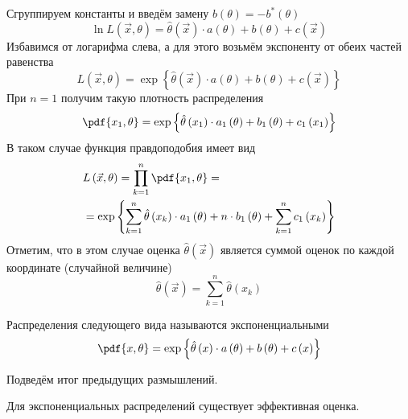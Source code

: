 Сгруппируем константы и введём замену
$b\left( \theta \right)=-b^*\left( \theta \right)$
\begin{equation*}
  \ln{L\left( \vec{x}, \theta \right)}
  = \hat{\theta}\left( \vec{x} \right)\cdot a\left( \theta \right)
    +b\left( \theta \right) + c\left( \vec{x} \right)
\end{equation*}
Избавимся от логарифма слева, а для этого возьмём экспоненту от обеих частей
равенства
\begin{equation*}
  L\left( \vec{x}, \theta \right)
  = \exp{\left\{\hat{\theta}\left( \vec{x} \right)\cdot a\left( \theta \right)
    + b\left( \theta \right) + c\left( \vec{x} \right)\right\}}
\end{equation*}
При $n = 1$ получим такую плотность распределения
\begin{equation*}
  \pdf{x_1,\theta}
  = \exp{\left\{\hat{\theta}\left( x_1 \right) \cdot a_1\left( \theta \right)
    + b_1\left( \theta \right) + c_1\left( x_1 \right)\right\}}
\end{equation*}
В таком случае функция правдоподобия имеет вид
\begin{align*}
  &L\left( \vec{x},\theta \right)
  = \prod_{k=1}^n\pdf{x_1,\theta}=\\
  &= \exp{\left\{\sum_{k=1}^n \hat{\theta}\left(x_k\right)\cdot a_1\left(\theta\right)
    +n\cdot b_1\left( \theta \right)
    + \sum_{k=1}^n c_1\left( x_k \right)\right\}}
\end{align*}
Отметим, что в этом случае оценка $\hat{\theta}\left( \vec{x} \right)$
является суммой оценок по каждой координате (случайной величине)
\begin{equation*}
  \hat{\theta}\left( \vec{x} \right)
  = \sum_{k=1}^n \hat{\theta}\left( x_k \right)
\end{equation*}

\begin{definition}
  \label{def:exponentialDistribution}
  Распределения следующего вида называются экспоненциальными
  $$\pdf{x,\theta}
    = \exp{\left\{\hat{\theta}\left(x\right)\cdot a\left(\theta\right)
      +b\left( \theta \right)+c\left( x \right)\right\}}$$
\end{definition}

Подведём итог предыдущих размышлений.

\begin{affirmation}
  \label{affirmation:efficientEstimator:exponentialExsistance}
  Для экспоненциальных распределений существует эффективная оценка.
\end{affirmation}

